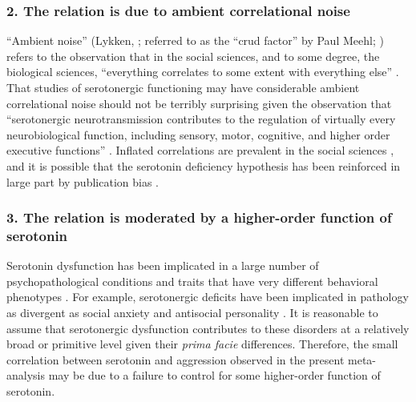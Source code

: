 \subsubsection{2. The relation is due to ambient correlational noise}
``Ambient noise'' (Lykken, \citeyear{Lykken1968}; referred to as the ``crud factor'' by Paul Meehl;  \citeyear{Meehl1990a}) refers to the observation that in the social sciences, and to some degree, the biological sciences, ``everything correlates to some extent with everything else'' \parencite[][204]{Meehl1990a}. That studies of serotonergic functioning may have considerable ambient correlational noise should not be terribly surprising given the observation that ``serotonergic neurotransmission contributes to the regulation of virtually every neurobiological function, including sensory, motor, cognitive, and higher order executive functions'' \parencite[35]{Kerman2011}. Inflated correlations are prevalent in the social sciences \parencite[see][]{Fiedler2011}, and it is possible that the serotonin deficiency hypothesis has been reinforced in large part by publication bias \parencite{Burdett2003, Levine2009, Rosenthal79, Sutton2000, Sutton09}.


\subsubsection{3. The relation is moderated by a higher-order function of serotonin}
Serotonin dysfunction has been implicated in a large number of psychopathological conditions and traits that have very different behavioral phenotypes \parencite{Deakin2003}. For example, serotonergic deficits have been implicated in pathology as divergent as social anxiety \parencite{Stein2002} and antisocial personality \parencite{Voellm2010}. It is reasonable to assume that serotonergic dysfunction contributes to these disorders at a relatively broad or primitive level given their \emph{prima facie} differences. Therefore, the small correlation between serotonin and aggression observed in the present meta-analysis may be due to a failure to control for some higher-order function of serotonin.


